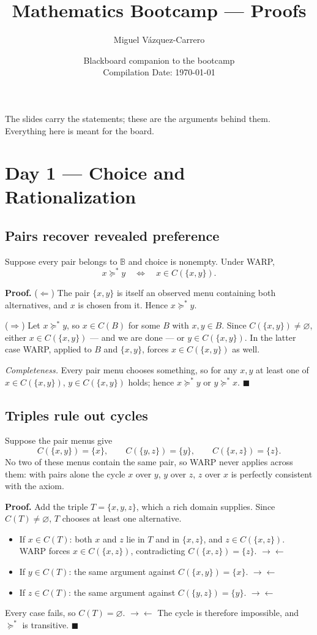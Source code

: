 \documentclass[11pt,a4paper]{article}
\title{\color{slideblue}\bfseries Mathematics Bootcamp --- Proofs}
\author{Miguel V\'azquez-Carrero}
\date{Blackboard companion to the bootcamp\\[.3em]\normalsize Compilation Date: \today}
\newcommand{\slideref}[1]{\par\vspace{-.3em}{\small\itshape Supports: #1.}\par\vspace{.55em}}
\newcommand{\done}{\hfill$\blacksquare$}
\newcommand{\contra}{\ensuremath{\rightarrow\leftarrow}}
\begin{document}
\maketitle

\noindent
The slides carry the statements; these are the arguments behind them.
Everything here is meant for the board.
\vspace{1em}

\section{Day 1 --- Choice and Rationalization}

\subsection{Pairs recover revealed preference}
\slideref{``WARP and Rationalizability''}
Suppose every pair belongs to $\mathbb B$ and choice is nonempty. Under WARP,
\[
x\succeq^* y \quad\Longleftrightarrow\quad x\in C(\{x,y\}).
\]

\noindent\textbf{Proof.}
($\Leftarrow$) The pair $\{x,y\}$ is itself an observed menu containing both
alternatives, and $x$ is chosen from it. Hence $x\succeq^* y$.

\noindent
($\Rightarrow$) Let $x\succeq^* y$, so $x\in C(B)$ for some $B$ with $x,y\in B$.
Since $C(\{x,y\})\neq\varnothing$, either $x\in C(\{x,y\})$ --- and we are done
--- or $y\in C(\{x,y\})$. In the latter case WARP, applied to $B$ and
$\{x,y\}$, forces $x\in C(\{x,y\})$ as well.

\noindent
\emph{Completeness.} Every pair menu chooses something, so for any $x,y$ at
least one of $x\in C(\{x,y\})$, $y\in C(\{x,y\})$ holds; hence $x\succeq^* y$
or $y\succeq^* x$. \done

\subsection{Triples rule out cycles}
\slideref{``WARP and Rationalizability''}
Suppose the pair menus give
\[
C(\{x,y\})=\{x\},\qquad C(\{y,z\})=\{y\},\qquad C(\{x,z\})=\{z\}.
\]
No two of these menus contain the same pair, so WARP never applies across them:
with pairs alone the cycle $x$ over $y$, $y$ over $z$, $z$ over $x$ is
perfectly consistent with the axiom.

\noindent\textbf{Proof.}
Add the triple $T=\{x,y,z\}$, which a rich domain supplies. Since
$C(T)\neq\varnothing$, $T$ chooses at least one alternative.
\begin{itemize}[nosep,leftmargin=1.6em]
  \item If $x\in C(T)$: both $x$ and $z$ lie in $T$ and in $\{x,z\}$, and
  $z\in C(\{x,z\})$. WARP forces $x\in C(\{x,z\})$, contradicting
  $C(\{x,z\})=\{z\}$. \contra
  \item If $y\in C(T)$: the same argument against $C(\{x,y\})=\{x\}$. \contra
  \item If $z\in C(T)$: the same argument against $C(\{y,z\})=\{y\}$. \contra
\end{itemize}
Every case fails, so $C(T)=\varnothing$. \contra{}
The cycle is
therefore impossible, and $\succeq^*$ is transitive. \done
\end{document}
